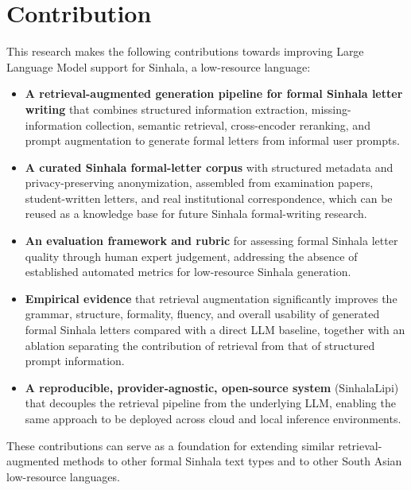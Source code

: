 \documentclass[12pt]{uomthesis}
\begin{document}
\section{Contribution}
This research makes the following contributions towards improving Large Language Model support for Sinhala, a low-resource language:

\begin{itemize}
    \item \textbf{A retrieval-augmented generation pipeline for formal Sinhala letter writing} that combines structured information extraction, missing-information collection, semantic retrieval, cross-encoder reranking, and prompt augmentation to generate formal letters from informal user prompts.
    \item \textbf{A curated Sinhala formal-letter corpus} with structured metadata and privacy-preserving anonymization, assembled from examination papers, student-written letters, and real institutional correspondence, which can be reused as a knowledge base for future Sinhala formal-writing research.
    \item \textbf{An evaluation framework and rubric} for assessing formal Sinhala letter quality through human expert judgement, addressing the absence of established automated metrics for low-resource Sinhala generation.
    \item \textbf{Empirical evidence} that retrieval augmentation significantly improves the grammar, structure, formality, fluency, and overall usability of generated formal Sinhala letters compared with a direct LLM baseline, together with an ablation separating the contribution of retrieval from that of structured prompt information.
    \item \textbf{A reproducible, provider-agnostic, open-source system} (SinhalaLipi) that decouples the retrieval pipeline from the underlying LLM, enabling the same approach to be deployed across cloud and local inference environments.
\end{itemize}

These contributions can serve as a foundation for extending similar retrieval-augmented methods to other formal Sinhala text types and to other South Asian low-resource languages.
\end{document}
